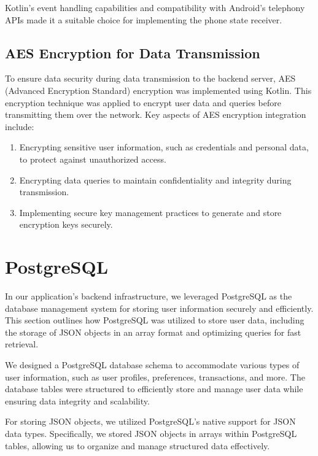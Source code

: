 Kotlin's event handling capabilities and compatibility with Android's telephony APIs made it a suitable choice for implementing the phone state receiver.

\subsection{AES Encryption for Data Transmission}

To ensure data security during data transmission to the backend server, AES (Advanced Encryption Standard) encryption was implemented using Kotlin. This encryption technique was applied to encrypt user data and queries before transmitting them over the network. Key aspects of AES encryption integration include:

\begin{enumerate}
  \item Encrypting sensitive user information, such as credentials and personal data, to protect against unauthorized access.
  \item Encrypting data queries to maintain confidentiality and integrity during transmission.
  \item Implementing secure key management practices to generate and store encryption keys securely.
\end{enumerate}


\section{PostgreSQL}

In our application's backend infrastructure, we leveraged PostgreSQL as the database management system for storing user information securely and efficiently. This section outlines how PostgreSQL was utilized to store user data, including the storage of JSON objects in an array format and optimizing queries for fast retrieval.

We designed a PostgreSQL database schema to accommodate various types of user information, such as user profiles, preferences, transactions, and more. The database tables were structured to efficiently store and manage user data while ensuring data integrity and scalability.

For storing JSON objects, we utilized PostgreSQL's native support for JSON data types. Specifically, we stored JSON objects in arrays within PostgreSQL tables, allowing us to organize and manage structured data effectively.


